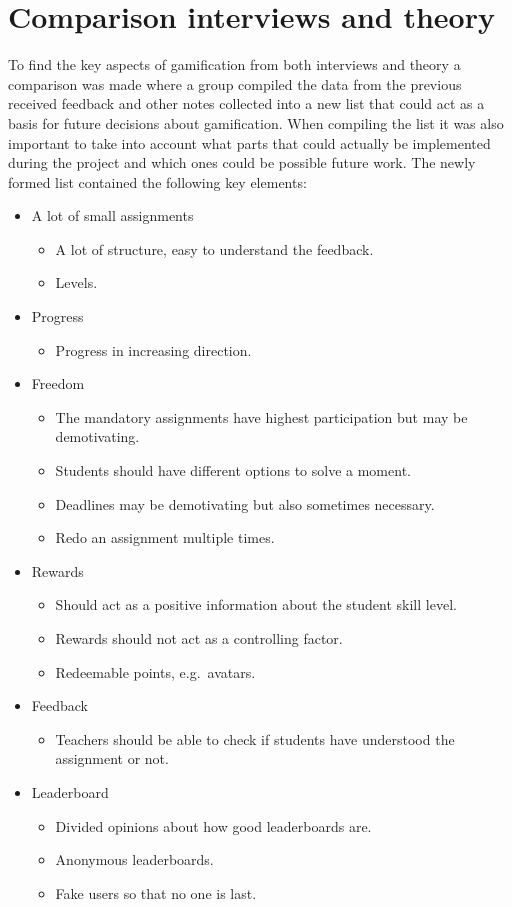 \section{Comparison interviews and theory} 
To find the key aspects of gamification from both interviews and theory a comparison was made where a group compiled the data from the previous received feedback and other notes collected into a new list that could act as a basis for future decisions about gamification.
When compiling the list it was also important to take into account what parts that could actually be implemented during the project and which ones could be possible future work.
The newly formed list contained the following key elements:
\begin{itemize}
\item A lot of small assignments
\begin{itemize}
 \item A lot of structure, easy to understand the feedback.
 \item Levels.
\end{itemize}
\item Progress
\begin{itemize}
 \item Progress in increasing direction.
\end{itemize}
\item Freedom
\begin{itemize}
 \item The mandatory assignments have highest participation but may be demotivating.
 \item Students should have different options to solve a moment.
 \item Deadlines may be demotivating but also sometimes necessary.
 \item Redo an assignment multiple times.
\end{itemize}
\item Rewards
\begin{itemize}
 \item Should act as a positive information about the student skill level.
 \item Rewards should not act as a controlling factor.
 \item Redeemable points, e.g.\ avatars.
\end{itemize}
\item Feedback
\begin{itemize}
 \item Teachers should be able to check if students have understood the assignment or not.
\end{itemize}
\item Leaderboard
\begin{itemize}
 \item Divided opinions about how good leaderboards are.
 \item Anonymous leaderboards.
 \item Fake users so that no one is last.
\end{itemize}
\end{itemize}


